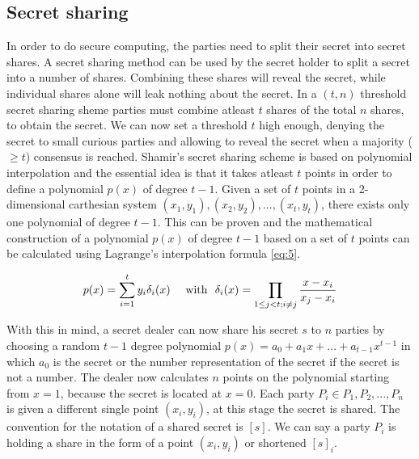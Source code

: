 \subsection{Secret sharing}
In order to do secure computing, the parties need to split their secret into secret shares. A secret sharing method can be used by the secret holder to split a secret into a number of shares. Combining these shares will reveal the secret, while individual shares alone will leak nothing about the secret. In a $(t,n)$ threshold secret sharing sheme parties must combine atleast $t$ shares of the total $n$ shares, to obtain the secret. We can now set a threshold $t$ high enough, denying the secret to small curious parties and allowing to reveal the secret when a majority ($\geq t$) consensus is reached. Shamir's secret sharing scheme \cite{shamir1979share} is based on polynomial interpolation and the essential idea is that it takes atleast $t$ points in order to define a polynomial $p(x)$ of degree $t-1$. Given a set of $t$ points in a 2-dimensional carthesian system  $(x_1, y_1), (x_2, y_2), ..., (x_t,y_t)$, there exists only one polynomial of degree $t-1$. This can be proven and the mathematical construction of a polynomial $p(x)$ of degree $t-1$ based on a set of $t$ points can be calculated using Lagrange's interpolation formula \ref{eq:5}.

\begin{equation} \label{eq:5}
\begin{aligned}
  p(x)= \sum_{i=1}^{t}y_{i}\delta_{i}(x)\text{\space\space\space\space with\space\space }\delta_{i}(x)=\prod_{1\leq j<t; i\neq j} \frac{x-x_i}{x_j-x_i}
\end{aligned}
\end{equation}

With this in mind, a secret dealer can now share his secret $s$ to $n$ parties by choosing a random $t-1$ degree polynomial $p(x)=a_{0} + a_{1}x + ... + a_{t-1}x^{t-1}$ in which $a_{0}$ is the secret or the number representation of the secret if the secret is not a number. The dealer now calculates $n$ points on the polynomial starting from $x=1$, because the secret is located at $x=0$. Each party $P_i \in {P_1, P_2, ..., P_n}$ is given a different single point $(x_i,y_i)$, at this stage the secret is shared. The convention for the notation of a shared secret is $[s]$. We can say a party $P_i$ is holding a share in the form of a point $(x_i,y_i)$ or shortened $[s]_i$.


